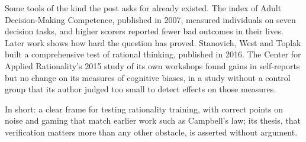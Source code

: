 \begin{afterword}
Some tools of the kind the post asks for already existed. The index of Adult Decision-Making Competence, published in 2007, measured individuals on seven decision tasks, and higher scorers reported fewer bad outcomes in their lives. Later work shows how hard the question has proved. Stanovich, West and Toplak built a comprehensive test of rational thinking, published in 2016. The Center for Applied Rationality's 2015 study of its own workshops found gains in self-reports but no change on its measures of cognitive biases, in a study without a control group that its author judged too small to detect effects on those measures.

In short: a clear frame for testing rationality training, with correct points on noise and gaming that match earlier work such as Campbell's law; its thesis, that verification matters more than any other obstacle, is asserted without argument.
\end{afterword}
